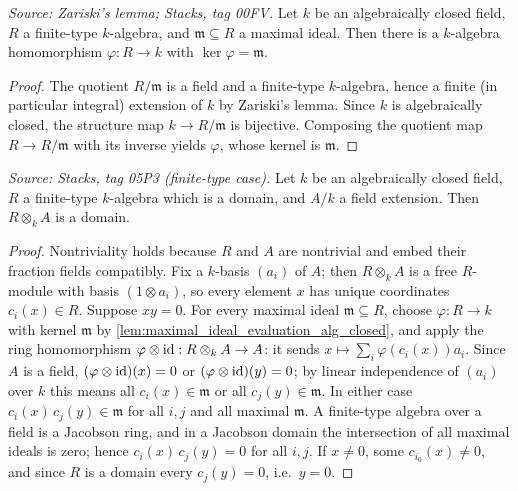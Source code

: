 \begin{lemma}\leanok
  \label{lem:maximal_ideal_evaluation_alg_closed}
  \textit{Source: Zariski's lemma; Stacks, tag 00FV.}
  Let \(k\) be an algebraically closed field, \(R\) a finite-type
  \(k\)-algebra, and \(\mathfrak m \subseteq R\) a maximal ideal. Then
  there is a \(k\)-algebra homomorphism \(\varphi : R \to k\) with
  \(\ker \varphi = \mathfrak m\).
\end{lemma}
\begin{proof}
  \leanok
  The quotient \(R/\mathfrak m\) is a field and a finite-type
  \(k\)-algebra, hence a finite (in particular integral) extension of
  \(k\) by Zariski's lemma. Since \(k\) is algebraically closed, the
  structure map \(k \to R/\mathfrak m\) is bijective. Composing the
  quotient map \(R \to R/\mathfrak m\) with its inverse yields
  \(\varphi\), whose kernel is \(\mathfrak m\).
\end{proof}

\begin{lemma}\leanok
  \label{lem:tensor_domain_finite_type_alg_closed}
  \textit{Source: Stacks, tag 05P3 (finite-type case).}
  Let \(k\) be an algebraically closed field, \(R\) a finite-type
  \(k\)-algebra which is a domain, and \(A/k\) a field extension. Then
  \(R \otimes_k A\) is a domain.
\end{lemma}
\begin{proof}
  \leanok
  Nontriviality holds because \(R\) and \(A\) are nontrivial and embed
  their fraction fields compatibly. Fix a \(k\)-basis \((a_i)\) of
  \(A\); then \(R \otimes_k A\) is a free \(R\)-module with basis
  \((1 \otimes a_i)\), so every element \(x\) has unique coordinates
  \(c_i(x) \in R\). Suppose \(x y = 0\). For every maximal ideal
  \(\mathfrak m \subseteq R\), choose
  \(\varphi : R \to k\) with kernel \(\mathfrak m\) by
  \cref{lem:maximal_ideal_evaluation_alg_closed}, and apply the ring
  homomorphism \(\varphi \otimes \operatorname{id} : R \otimes_k A \to A\): it sends
  \(x \mapsto \sum_i \varphi(c_i(x)) a_i\). Since \(A\) is a field,
  \((\varphi \otimes \operatorname{id})(x) = 0\) or \((\varphi \otimes \operatorname{id})(y) = 0\);
  by linear independence of \((a_i)\) over \(k\) this means all
  \(c_i(x) \in \mathfrak m\) or all \(c_j(y) \in \mathfrak m\). In
  either case \(c_i(x)\, c_j(y) \in \mathfrak m\) for all \(i, j\) and
  all maximal \(\mathfrak m\). A finite-type algebra over a field is a
  Jacobson ring, and in a Jacobson domain the intersection of all
  maximal ideals is zero; hence \(c_i(x)\, c_j(y) = 0\) for all
  \(i, j\). If \(x \neq 0\), some \(c_{i_0}(x) \neq 0\), and since
  \(R\) is a domain every \(c_j(y) = 0\), i.e.\ \(y = 0\).
\end{proof}

